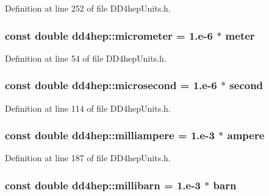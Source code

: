 Definition at line 252 of file DD4hepUnits.h.\hypertarget{namespacedd4hep_ae1c0791e549db4ff640f02a54c2e4e11}{
\subsubsection[{micrometer}]{\setlength{\rightskip}{0pt plus 5cm}const double {\bf dd4hep::micrometer} = 1.e-\/6 $\ast$ {\bf meter}}}
\label{namespacedd4hep_ae1c0791e549db4ff640f02a54c2e4e11}


Definition at line 54 of file DD4hepUnits.h.\hypertarget{namespacedd4hep_a82330b93e44ff2e4bc64471f4fb3387d}{
\subsubsection[{microsecond}]{\setlength{\rightskip}{0pt plus 5cm}const double {\bf dd4hep::microsecond} = 1.e-\/6 $\ast$ {\bf second}}}
\label{namespacedd4hep_a82330b93e44ff2e4bc64471f4fb3387d}


Definition at line 114 of file DD4hepUnits.h.\hypertarget{namespacedd4hep_a0df135e4eeb5cd94ace403e633d0c4af}{
\subsubsection[{milliampere}]{\setlength{\rightskip}{0pt plus 5cm}const double {\bf dd4hep::milliampere} = 1.e-\/3 $\ast$ {\bf ampere}}}
\label{namespacedd4hep_a0df135e4eeb5cd94ace403e633d0c4af}


Definition at line 187 of file DD4hepUnits.h.\hypertarget{namespacedd4hep_af4d3d1b2777005b2e1406992fe27e976}{
\subsubsection[{millibarn}]{\setlength{\rightskip}{0pt plus 5cm}const double {\bf dd4hep::millibarn} = 1.e-\/3 $\ast$ {\bf barn}}}
\label{namespacedd4hep_af4d3d1b2777005b2e1406992fe27e976}


